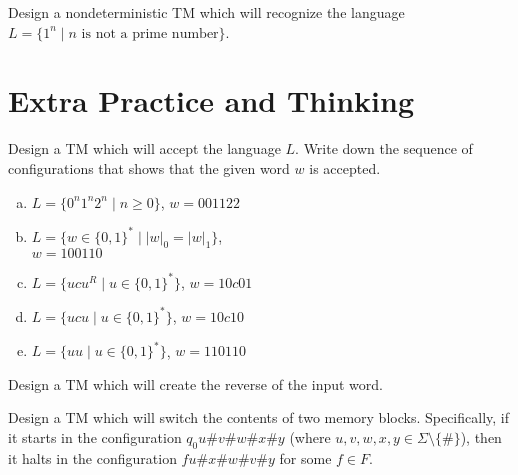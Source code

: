 \documentclass[a4paper,12pt]{amsart}
\begin{document}
\begin{problem}
    
    Design a nondeterministic TM which will recognize the language $L=\{1^n \mid\text{$n$ is not a prime number}\}$.

\end{problem}


\section*{Extra Practice and Thinking}


\medskip\begin{problem}

    Design a TM which will accept the language $L$. Write down the sequence of configurations that shows that the given word $w$ is accepted. 
    
    \begin{multicols}{2}
        \begin{enumerate}[(a)]
            \item $L=\{0^n1^n2^n\mid n\geq 0\}$, $w=001122$
            \item $L=\{w\in\{0,1\}^*\mid |w|_0=|w|_1\}$,\\ $w=100110$
            \item $L=\{ucu^R\mid u\in\{0,1\}^*\}$, $w=10c01$
            \item $L=\{ucu\mid u \in\{0,1\}^*\}$, $w=10c10$
            \item $L=\{uu\mid u \in\{0,1\}^*\}$, $w=110110$
        \end{enumerate}
    \end{multicols}

\end{problem}
    
    
\medskip\begin{problem}[Reverse]
    
    Design a TM which will create the reverse of the input word.

\end{problem}
    

\begin{problem}

    Design a TM which will switch the contents of two memory blocks. Specifically, if it starts in the configuration $q_0u\#v\#w\#x\#y$ (where $u, v, w, x, y \in \Sigma\setminus\{\#\}$), then it halts in the configuration $fu\#x\#w\#v\#y$ for some $f\in F$. %

\end{problem}
       
\end{document}

